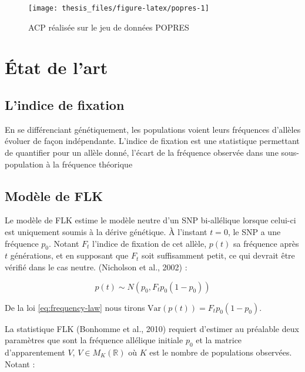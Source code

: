 \documentclass[12pt,twoside]{reedthesis}
\begin{document}
  \begin{figure}
  
  {\centering \texttt{[image: thesis\_files/figure-latex/popres-1]} 
  
  }
  
  \caption{ACP réalisée sur le jeu de données POPRES}\label{fig:popres}
  \end{figure}
  
  \chapter{État de l'art}\label{etat-de-lart}
  
  \section{L'indice de fixation}\label{lindice-de-fixation}
  
  En se différenciant génétiquement, les populations voient leurs
  fréquences d'allèles évoluer de façon indépendante. L'indice de fixation
  est une statistique permettant de quantifier pour un allèle donné,
  l'écart de la fréquence observée dans une sous-population à la fréquence
  théorique
  
  \section{Modèle de FLK}\label{modele-de-flk}
  
  Le modèle de FLK estime le modèle neutre d'un SNP bi-allélique lorsque
  celui-ci est uniquement soumis à la dérive génétique. À l'instant
  \(t = 0\), le SNP a une fréquence \(p_0\). Notant \(F_t\) l'indice de
  fixation de cet allèle, \(p(t)\) sa fréquence après \(t\) générations,
  et en supposant que \(F_t\) soit suffisamment petit, ce qui devrait être
  vérifié dans le cas neutre. (Nicholson et al., 2002) :
  
  \begin{equation} 
    p(t) \sim N(p_0, F_t p_0 (1-p_0)) 
    \label{eq:frequency-law}
  \end{equation}
  
  De la loi \eqref{eq:frequency-law} nous tirons
  \(\text{Var}(p(t)) = F_t p_0 (1-p_0)\).
  
  La statistique FLK (Bonhomme et al., 2010) requiert d'estimer au
  préalable deux paramètres que sont la fréquence allélique initiale
  \(p_0\) et la matrice d'apparentement \(V\), \(V \in M_K(\mathbb{R})\)
  où \(K\) est le nombre de populations observées. Notant :
  
\end{document}
